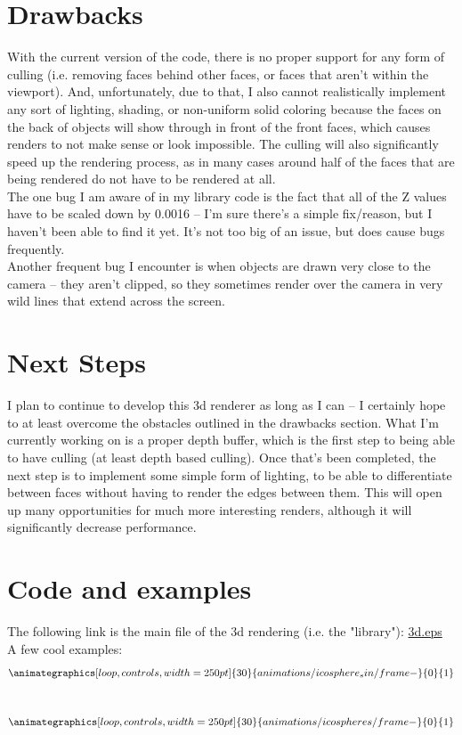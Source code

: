\documentclass[12pt]{article}
\begin{document}
	\section{Drawbacks}
	With the current version of the code, there is no proper support for any form of culling (i.e. removing faces behind other faces, or faces that aren't within the viewport). And, unfortunately, due to that, I also cannot realistically implement any sort of lighting, shading, or non-uniform solid coloring because the faces on the back of objects will show through in front of the front faces, which causes renders to not make sense or look impossible. The culling will also significantly speed up the rendering process, as in many cases around half of the faces that are being rendered do not have to be rendered at all.\\The one bug I am aware of in my library code is the fact that all of the Z values have to be scaled down by 0.0016 -- I'm sure there's a simple fix/reason, but I haven't been able to find it yet. It's not too big of an issue, but does cause bugs frequently.\\Another frequent bug I encounter is when objects are drawn very close to the camera -- they aren't clipped, so they sometimes render over the camera in very wild lines that extend across the screen.
	\section{Next Steps}
	I plan to continue to develop this 3d renderer as long as I can -- I certainly hope to at least overcome the obstacles outlined in the drawbacks section. What I'm currently working on is a proper depth buffer, which is the first step to being able to have culling (at least depth based culling). Once that's been completed, the next step is to implement some simple form of lighting, to be able to differentiate between faces without having to render the edges between them. This will open up many opportunities for much more interesting renders, although it will significantly decrease performance. 
	\section{Code and examples}
	The following link is the main file of the 3d rendering (i.e. the "library"):
	\href{https://gist.github.com/bn0367/3b670a37fc172aa1ae74cbbafd8cbb5a}{3d.eps}\\
	A few cool examples: 
	\begin{align*}\animategraphics[loop,controls,width=250pt]{30}{animations/icosphere_sin/frame-}{0}{1}\end{align*}\\
	\begin{align*}\animategraphics[loop,controls,width=250pt]{30}{animations/icospheres/frame-}{0}{1}\end{align*}\\
\end{document}
